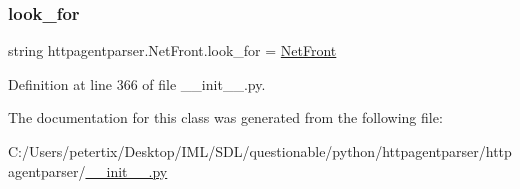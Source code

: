 \subsubsection{\texorpdfstring{look\+\_\+for}{look\_for}}
{\footnotesize\ttfamily string httpagentparser.\+Net\+Front.\+look\+\_\+for = \textquotesingle{}\hyperlink{classhttpagentparser_1_1_net_front}{Net\+Front}\textquotesingle{}\hspace{0.3cm}{\ttfamily [static]}}



Definition at line 366 of file \+\_\+\+\_\+init\+\_\+\+\_\+.\+py.



The documentation for this class was generated from the following file\+:\begin{DoxyCompactItemize}
\item 
C\+:/\+Users/petertix/\+Desktop/\+I\+M\+L/\+S\+D\+L/questionable/python/httpagentparser/httpagentparser/\hyperlink{____init_____8py}{\+\_\+\+\_\+init\+\_\+\+\_\+.\+py}\end{DoxyCompactItemize}
